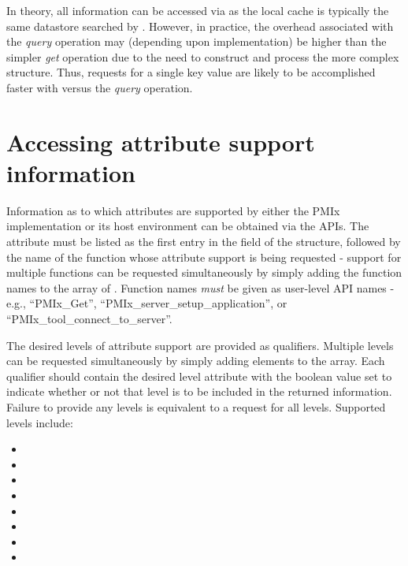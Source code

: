 In theory, all information can be accessed via  as the local cache is typically the same datastore searched by . However, in practice, the overhead associated with the \emph{query} operation may (depending upon implementation) be higher than the simpler \emph{get} operation due to the need to construct and process the more complex  structure. Thus, requests for a single key value are likely to be accomplished faster with  versus the \emph{query} operation.


\section{Accessing attribute support information}
\label{chap:api_job_mgmt:queryattrs}

Information as to which attributes are supported by either the \ac{PMIx} implementation or its host environment can be obtained via the  \acp{API}. The  attribute must be listed as the first entry in the  field of the  structure, followed by the name of the function whose attribute support is being requested - support for multiple functions can be requested simultaneously by simply adding the function names to the array of . Function names \emph{must} be given as user-level \ac{API} names - e.g., ``PMIx_Get'', ``PMIx_server_setup_application'', or ``PMIx_tool_connect_to_server''.

The desired levels of attribute support are provided as qualifiers. Multiple levels can be requested simultaneously by simply adding elements to the  array. Each qualifier should contain the desired level attribute with the boolean value set to indicate whether or not that level is to be included in the returned information. Failure to provide any levels is equivalent to a request for all levels. Supported levels include:

\begin{itemize}
    \item {}
    \item {}
    \item {}
    \item {}
    \item {}
    \item {}
    \item {}
    \item {}
\end{itemize}

